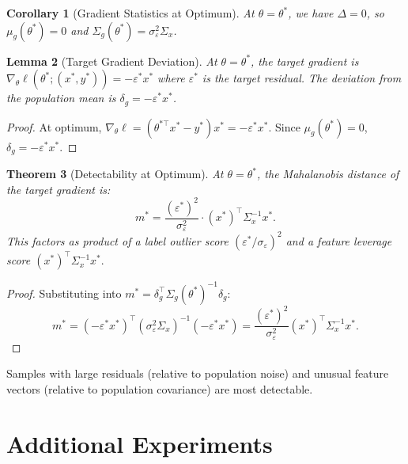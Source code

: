 \documentclass{article}
\theoremstyle{plain}
\newtheorem{theorem}{Theorem}[section]
\newtheorem{lemma}[theorem]{Lemma}
\newtheorem{corollary}[theorem]{Corollary}
\theoremstyle{definition}
\theoremstyle{remark}
\renewcommand{\epsilon}{\varepsilon}
\begin{document}
\begin{corollary}[Gradient Statistics at Optimum]
    At $\theta = \theta^*$, we have $\Delta = 0$, so $\mu_g(\theta^*) = 0$ and $\Sigma_g(\theta^*) = \sigma_\epsilon^2 \Sigma_x$.
\end{corollary}

\begin{lemma}[Target Gradient Deviation]
    At $\theta = \theta^*$, the target gradient is $\nabla_\theta \ell(\theta^*; (x^*, y^*)) = -\epsilon^* x^*$ where $\epsilon^*$ is the target residual. The deviation from the population mean is $\delta_g = -\epsilon^* x^*$.
\end{lemma}

\begin{proof}
    At optimum, $\nabla_\theta \ell = (\theta^{*\top}x^* - y^*)x^* = -\epsilon^* x^*$. Since $\mu_g(\theta^*) = 0$, $\delta_g = -\epsilon^* x^*$.
\end{proof}

\begin{theorem}[Detectability at Optimum]
    \label{thm:sgd-detectability}
    At $\theta = \theta^*$, the Mahalanobis distance of the target gradient is:
    \begin{equation*}
        m^* = \frac{(\epsilon^*)^2}{\sigma_\epsilon^2} \cdot (x^*)^\top \Sigma_x^{-1} x^*.
    \end{equation*}
    This factors as product of a \emph{label outlier score} $(\epsilon^*/\sigma_\epsilon)^2$ and a \emph{feature leverage score} $(x^*)^\top \Sigma_x^{-1} x^*.$
\end{theorem}

\begin{proof}
    Substituting into $m^* = \delta_g^\top \Sigma_g(\theta^*)^{-1} \delta_g$:
    \begin{equation*}
        m^* = (-\epsilon^* x^*)^\top (\sigma_\epsilon^2 \Sigma_x)^{-1} (-\epsilon^* x^*) = \frac{(\epsilon^*)^2}{\sigma_\epsilon^2} (x^*)^\top \Sigma_x^{-1} x^*.
    \end{equation*}
\end{proof}
Samples with large residuals (relative to population noise) and unusual feature vectors (relative to population covariance) are most detectable.

%
%
%
\section{Additional Experiments}
\label{app:experiments}
\end{document}
